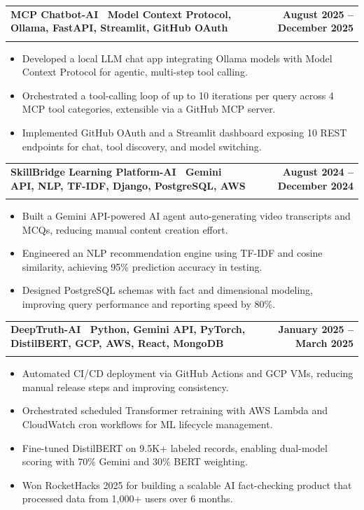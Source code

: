 \documentclass[letterpaper,11pt]{article}
\makeatletter
\newcommand{\resumeItem}[1]{\item\small{#1 \vspace{-4pt}}}
\newcommand{\resumeSubheading}[4]{
    \vspace{-2pt}\item
    \begin{tabular*}{1.0\textwidth}[t]{l@{\extracolsep{\fill}}r}
        \textbf{#1} & \textbf{\small #2} \\
        \textit{\small#3} & \textit{\small #4}
    \end{tabular*}\vspace{-7pt}
}
\newcommand{\resumeItemListStart}{\begin{itemize}}
\newcommand{\resumeItemListEnd}{\end{itemize}\vspace{-7pt}}
\makeatother
\begin{document}
\resumeSubheading
{\textbf{MCP Chatbot-AI} \textnormal{\textbar\ {Model Context Protocol, Ollama, FastAPI, Streamlit, GitHub OAuth}}}{August 2025 -- December 2025}{}{}
\vspace{-0.6cm}
\resumeItemListStart

\resumeItem{Developed a local LLM chat app integrating Ollama models with Model Context Protocol for agentic, multi-step tool calling.}
\vspace{0.15cm}
\resumeItem{Orchestrated a tool-calling loop of up to 10 iterations per query across 4 MCP tool categories, extensible via a GitHub MCP server.}
\vspace{0.15cm}
\resumeItem{Implemented GitHub OAuth and a Streamlit dashboard exposing 10 REST endpoints for chat, tool discovery, and model switching.}
\vspace{0.15cm}
\resumeItemListEnd

\resumeSubheading
{\textbf{SkillBridge Learning Platform-AI} \textnormal{\textbar\ {Gemini API, NLP, TF-IDF, Django, PostgreSQL, AWS}}}{August 2024 -- December 2024}{}{}
\vspace{-0.6cm}
\resumeItemListStart

\resumeItem{Built a Gemini API-powered AI agent auto-generating video transcripts and MCQs, reducing manual content creation effort.}
\vspace{0.15cm}
\resumeItem{Engineered an NLP recommendation engine using TF-IDF and cosine similarity, achieving 95\% prediction accuracy in testing.}
\vspace{0.15cm}
\resumeItem{Designed PostgreSQL schemas with fact and dimensional modeling, improving query performance and reporting speed by 80\%.}
\resumeItemListEnd

\resumeSubheading
{\textbf{DeepTruth-AI} \textnormal{\textbar\ {Python, Gemini API, PyTorch, DistilBERT, GCP, AWS, React, MongoDB}}}{January 2025 -- March 2025}{}{}
\vspace{-0.6cm}
\resumeItemListStart

\resumeItem{Automated CI/CD deployment via GitHub Actions and GCP VMs, reducing manual release steps and improving consistency.}
\vspace{0.15cm}
\resumeItem{Orchestrated scheduled Transformer retraining with AWS Lambda and CloudWatch cron workflows for ML lifecycle management.}
\vspace{0.15cm}
\resumeItem{Fine-tuned DistilBERT on 9.5K+ labeled records, enabling dual-model scoring with 70\% Gemini and 30\% BERT weighting.}
\vspace{0.15cm}
\resumeItem{Won RocketHacks 2025 for building a scalable AI fact-checking product that processed data from 1,000+ users over 6 months.}
\vspace{0.15cm}
\resumeItemListEnd
\end{document}
